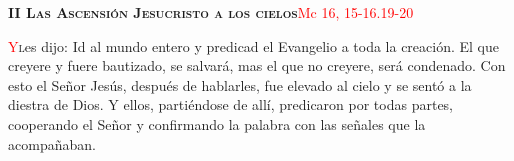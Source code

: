 \noindent\textbf{\textsc{II Las Ascensión Jesucristo a los cielos}}\hfill\textcolor{red}{Mc 16, 15-16.19-20}

\vspace{0.25em}

\lettrine[lines=2]{\textcolor{red}{Y}} les dijo: Id al mundo entero y predicad el Evangelio a toda la creación.
El que creyere y fuere bautizado, se salvará, mas el que no creyere, será condenado. Con esto el Señor Jesús, después de hablarles, fue elevado al cielo y se sentó a la diestra de Dios.
Y ellos, partiéndose de allí, predicaron por todas partes, cooperando el Señor y confirmando la palabra con las señales que la acompañaban.